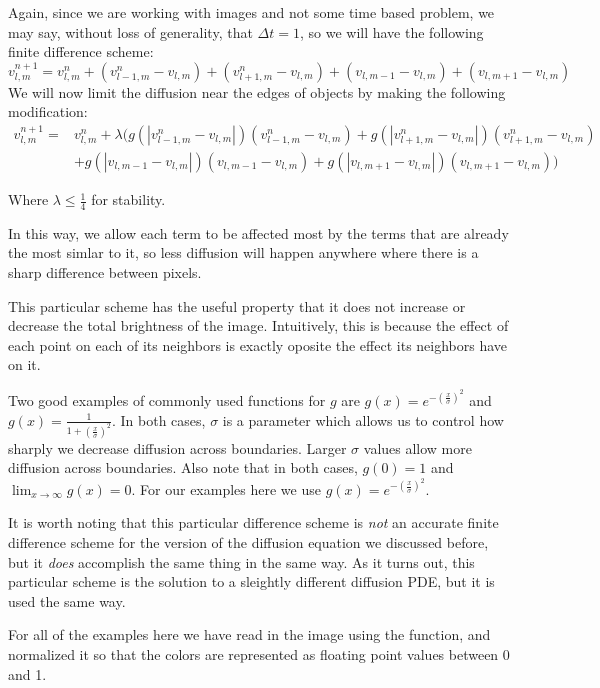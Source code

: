 Again, since we are working with images and not some time based problem, we may say, without loss of generality, that $\Delta t = 1$, so we will have the following finite difference scheme:
$$v_{l,m}^{n+1} = v_{l,m}^n + (v_{l-1,m}^n - v_{l,m}) + (v_{l+1,m}^n - v_{l,m}) + (v_{l,m-1} - v_{l,m}) + (v_{l,m+1} - v_{l,m})$$
We will now limit the diffusion near the edges of objects by making the following modification:
\begin{equation*}
\begin{split}
v_{l,m}^{n+1} =& v_{l,m}^n + \lambda (g(|v_{l-1,m}^n - v_{l,m}|)(v_{l-1,m}^n - v_{l,m}) + g(|v_{l+1,m}^n - v_{l,m}|)(v_{l+1,m}^n - v_{l,m}) \\
 &+ g(|v_{l,m-1} - v_{l,m}|)(v_{l,m-1} - v_{l,m}) + g(|v_{l,m+1} - v_{l,m}|)(v_{l,m+1} - v_{l,m}))
\end{split}
\end{equation*}

Where $\lambda \leq \frac{1}{4}$ for stability.

In this way, we allow each term to be affected most by the terms that are already the most simlar to it, so less diffusion will happen anywhere where there is a sharp difference between pixels.

This particular scheme has the useful property that it does not increase or decrease the total brightness of the image.
Intuitively, this is because the effect of each point on each of its neighbors is exactly oposite the effect its neighbors have on it.

Two good examples of commonly used functions for $g$ are $g(x) = e^{-\left(\frac{x}{\sigma}\right)^2}$ and $g(x) = \frac{1}{1+\left(\frac{x}{\sigma}\right)^2}$. 
In both cases, $\sigma$ is a parameter which allows us to control how sharply we decrease diffusion across boundaries.
Larger $\sigma$ values allow more diffusion across boundaries.
Also note that in both cases, $g(0) = 1$ and $\displaystyle{\lim_{x\to \infty} g(x) = 0}$.
For our examples here we use $g(x)=e^{-\left(\frac{x}{\sigma}\right)^2}$.

It is worth noting that this particular difference scheme is \textit{not} an accurate finite difference scheme for the version of the diffusion equation we discussed before, but it \textit{does} accomplish the same thing in the same way.
As it turns out, this particular scheme is the solution to a sleightly different diffusion PDE, but it is used the same way.

For all of the examples here we have read in the image using the  function, and normalized it so that the colors are represented as floating point values between 0 and 1.


